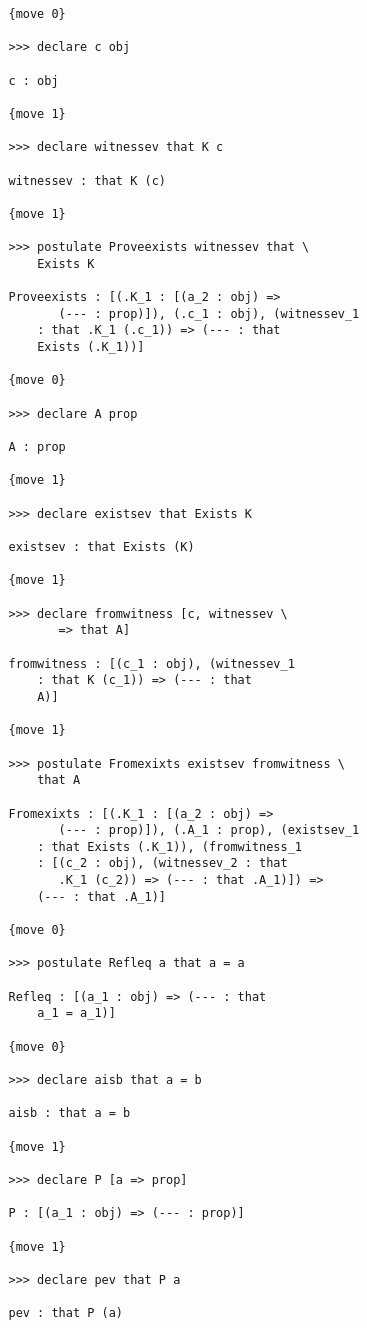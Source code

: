 \documentclass[12pt]{article}
\begin{document}
\begin{enumerate}
\begin{verbatim}
   {move 0}

   >>> declare c obj

   c : obj

   {move 1}

   >>> declare witnessev that K c

   witnessev : that K (c)

   {move 1}

   >>> postulate Proveexists witnessev that \
       Exists K

   Proveexists : [(.K_1 : [(a_2 : obj) => 
          (--- : prop)]), (.c_1 : obj), (witnessev_1 
       : that .K_1 (.c_1)) => (--- : that 
       Exists (.K_1))]

   {move 0}

   >>> declare A prop

   A : prop

   {move 1}

   >>> declare existsev that Exists K

   existsev : that Exists (K)

   {move 1}

   >>> declare fromwitness [c, witnessev \
          => that A]

   fromwitness : [(c_1 : obj), (witnessev_1 
       : that K (c_1)) => (--- : that 
       A)]

   {move 1}

   >>> postulate Fromexixts existsev fromwitness \
       that A

   Fromexixts : [(.K_1 : [(a_2 : obj) => 
          (--- : prop)]), (.A_1 : prop), (existsev_1 
       : that Exists (.K_1)), (fromwitness_1 
       : [(c_2 : obj), (witnessev_2 : that 
          .K_1 (c_2)) => (--- : that .A_1)]) => 
       (--- : that .A_1)]

   {move 0}

   >>> postulate Refleq a that a = a

   Refleq : [(a_1 : obj) => (--- : that 
       a_1 = a_1)]

   {move 0}

   >>> declare aisb that a = b

   aisb : that a = b

   {move 1}

   >>> declare P [a => prop]

   P : [(a_1 : obj) => (--- : prop)]

   {move 1}

   >>> declare pev that P a

   pev : that P (a)


\end{verbatim}
\end{enumerate}
\end{document}
